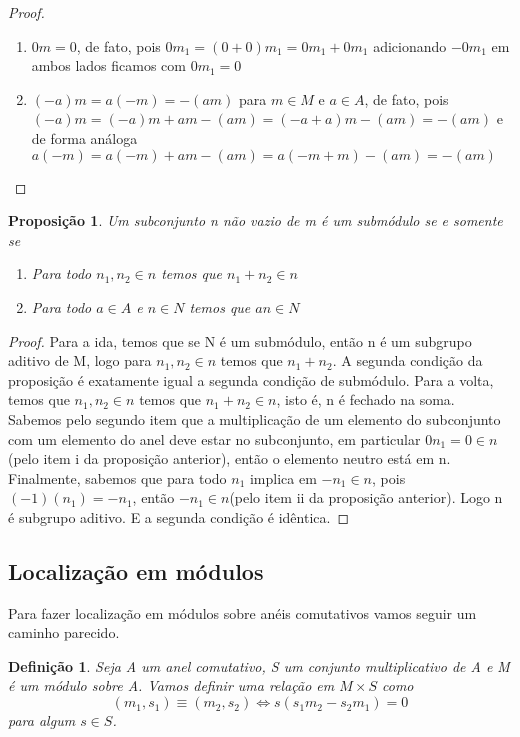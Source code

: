 \documentclass[10pt,a4paper]{article}
\newtheorem{proposition}[theorem]{Proposição}
\newtheorem{definition}[theorem]{Definição}
\begin{document}
\begin{proof}
	\begin{enumerate}
		\item $0m=0$, de fato, pois $0m_1=(0+0)m_1=0m_1+0m_1$ adicionando $-0m_1$ em ambos lados ficamos com $0m_1=0$
		\item $(-a)m=a(-m)=-(am)$ para $m \in M$ e $a \in A$, de fato, pois $(-a)m=(-a)m+am-(am)=(-a+a)m-(am)=-(am)$ e de forma análoga $a(-m)=a(-m)+am-(am)=a(-m+m)-(am)=-(am)$
	\end{enumerate}
\end{proof}

\begin{proposition}
	Um subconjunto n não vazio de m é um submódulo se e somente se
	\begin{enumerate}
		\item Para todo $n_1, n_2 \in n$ temos que $n_1+n_2 \in n$
		\item Para todo $a \in A$ e $n \in N$ temos que $an \in N$
	\end{enumerate}
\end{proposition}
\begin{proof}
	Para a ida, temos que se N é um submódulo, então n é um subgrupo aditivo de M, logo para $n_1, n_2 \in n$ temos que $n_1+n_2$. A segunda condição da proposição é exatamente igual a segunda condição de submódulo.
	Para a volta, temos que  $n_1, n_2 \in n$ temos que $n_1+n_2 \in n$, isto é, n é fechado na soma. Sabemos pelo segundo item que a multiplicação de um elemento do subconjunto com um elemento do anel deve estar no subconjunto, em particular $0 n_1 = 0 \in n$(pelo item i da proposição anterior), então o elemento neutro está em n. Finalmente, sabemos que para todo $n_1$ implica em $-n_1 \in n$, pois $(-1)(n_1)=-n_1$, então $-n_1 \in n$(pelo item ii da proposição anterior). Logo n é subgrupo aditivo. E a segunda condição é idêntica.
\end{proof}


\subsection{Localização em módulos}

Para fazer localização em módulos sobre anéis comutativos vamos seguir um caminho parecido.

\begin{definition}
	Seja A um anel comutativo, S um conjunto multiplicativo de A e M é um módulo sobre A. Vamos definir uma relação em $M \times S$ como $$(m_1,s_1) \equiv (m_2, s_2) \Leftrightarrow s(s_1m_2-s_2m_1)=0$$ para algum  $s \in S$.
\end{definition}
\end{document}
